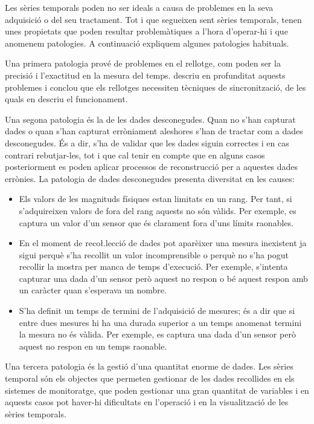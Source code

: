 Les sèries temporals poden no ser ideals a causa de problemes en la
seva adquisició o del seu tractament. Tot i que segueixen sent sèries
temporals, tenen unes propietats que poden resultar problemàtiques a
l'hora d'operar-hi i que anomenem patologies. A continuació expliquem
algunes patologies habituals.



Una primera patologia prové de problemes en el rellotge, com poden ser
la precisió i l'exactitud en la mesura del
temps. \textcite[cap.~3]{kopetz11:realtime} descriu en profunditat
aquests problemes i conclou que els rellotges necessiten tècniques de
sincronització, de les quals en descriu el funcionament.



Una segona patologia és la de les dades desconegudes. Quan no s'han
capturat dades o quan s'han capturat erròniament aleshores s'han de
tractar com a dades desconegudes. És a dir, s'ha de validar que les
dades siguin correctes i en cas contrari rebutjar-les, tot i que cal
tenir en compte que en alguns casos posteriorment es poden aplicar
processos de reconstrucció per a aquestes dades errònies.  La
patologia de dades desconegudes presenta diversitat en les causes:
\begin{itemize}

\item Els valors de les magnituds físiques estan limitats en un
  rang. Per tant, si s'adquireixen valors de fora del rang aquests no
  són vàlids. Per exemple, es captura un valor d'un sensor que és
  clarament fora d'uns límits raonables.

\item En el moment de reco\l.lecció de dades pot aparèixer una mesura
  inexistent ja sigui perquè s'ha recollit un valor incomprensible o
  perquè no s'ha pogut recollir la mostra per manca de temps
  d'execució. Per exemple, s'intenta capturar una dada d'un sensor
  però aquest no respon o bé aquest respon amb un caràcter quan
  s'esperava un nombre.

\item S'ha definit un temps de termini de l'adquisició de mesures; és
  a dir que si entre dues mesures hi ha una durada superior a un temps
  anomenat termini la mesura no és vàlida. Per exemple, es captura una
  dada d'un sensor però aquest no respon en un temps raonable.
\end{itemize}


Una tercera patologia és la gestió d’una quantitat enorme de dades.
Les sèries temporal són els objectes que permeten gestionar de les
dades recollides en els sistemes de monitoratge, que poden gestionar
una gran quantitat de variables i en aquests casos pot haver-hi
dificultats en l'operació i en la visualització de les sèries
temporals.



